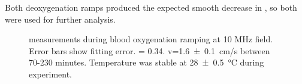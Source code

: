 Both deoxygenation ramps produced the expected smooth decrease in \Ttwo, so both were used for further analysis.
\begin{figure}[htp]
\centering
{}



\caption[\Ttwo measurements during blood oxygenation ramping at 10 MHz field]{\Ttwo measurements during blood oxygenation ramping at 10 MHz field. Error bars show \Ttwo fitting error. \Hct = 0.34. v=\SI{1.6 \pm 0.1}{cm/s} between  70-230 minutes. Temperature was stable at \SI{28 \pm 0.5}{\celsius} during experiment.}
\label{fig:contflow-10mhzT2Time}
\end{figure}


